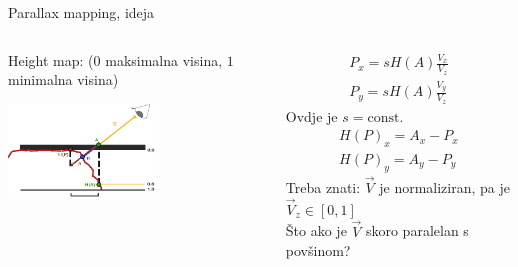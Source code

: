\documentclass[9pt]{beamer}
\begin{document}
\begin{frame}{Parallax mapping, ideja}
	\begin{columns}
		\begin{column}{0.4\textwidth}
				Height map: ($0$ maksimalna visina, $1$ minimalna visina)
			\begin{center}
				\includegraphics[width=4cm]{slike/parallax_mapping_depth.png}
			\end{center}
		\end{column}
		\begin{column}{0.6\textwidth}
				\begin{align*}
			P_x = s H(A)\frac{V_x}{V_z} \\ 
			P_y = s H(A)\frac{V_y}{V_z}
			\end{align*}
			Ovdje je $s=\mathrm{const.}$ 
			\begin{align*}
			H(P)_x = A_x - P_x \\
			H(P)_y = A_y - P_y
			\end{align*}
			Treba znati: $\vec{V}$ je normaliziran, pa je $\vec{V}_z \in \left[0, 1\right]$ \\
			Što ako je $\vec{V}$ skoro paralelan s povšinom?
		\end{column}
	\end{columns}
\end{frame}
\end{document}
